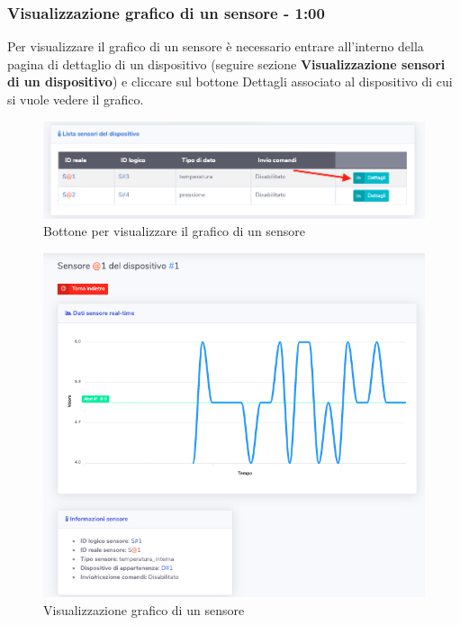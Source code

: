 	\subsubsection{Visualizzazione grafico di un sensore - 1:00}
		Per visualizzare il grafico di un sensore è necessario entrare all'interno della pagina di dettaglio di un dispositivo (seguire sezione \textbf{Visualizzazione sensori di un dispositivo}) e cliccare sul bottone Dettagli associato al dispositivo di cui si vuole vedere il grafico.
		\begin{figure}[H]
		\centering
		\includegraphics[scale=0.600]{res/images/membro/clicGraficoSens.png}
		\caption{Bottone per visualizzare il grafico di un sensore}
		\end{figure}
		\begin{figure}[H]
		\centering
		\includegraphics[scale=0.600]{res/images/membro/graficoSens.png}
		\caption{Visualizzazione grafico di un sensore}
		\end{figure}
		


